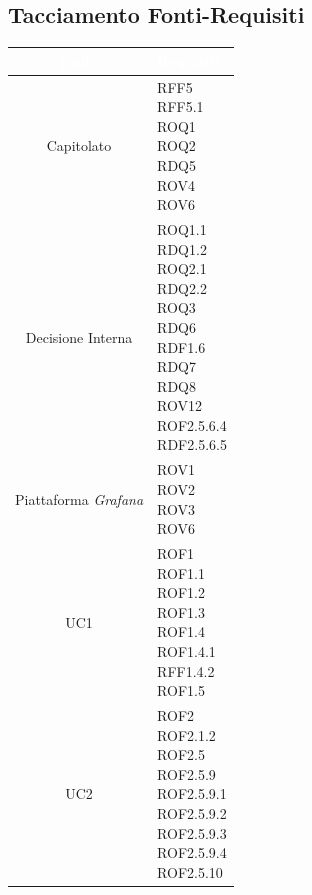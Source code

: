 \subsection{Tacciamento Fonti-Requisiti}\label{Tracciamento}
\begin{center}
\begin{longtable}[c]{|c|m{}|}
\hline
\rowcolor{bluelogo}\textbf{\textcolor{white}{Fonte}} & \textbf{\textcolor{white}{Requisiti}}\\
\hline \hline
\endhead
Capitolato & \makecell{RFF5\\RFF5.1\\ROQ1\\ROQ2\\RDQ5\\ROV4\\ROV6}\\
\hline
\rowcolor{grigio}Decisione Interna & \makecell{ROQ1.1\\RDQ1.2\\ROQ2.1\\RDQ2.2\\ROQ3\\RDQ6\\RDF1.6\\RDQ7\\RDQ8\\ROV12\\ROF2.5.6.4\\RDF2.5.6.5}\\
\hline
Piattaforma \textit{Grafana} & \makecell{ROV1\\ROV2\\ROV3\\ROV6}\\
\hline
\rowcolor{grigio}UC1 & \makecell{ROF1\\ROF1.1\\ROF1.2\\ROF1.3\\ROF1.4\\ROF1.4.1\\RFF1.4.2\\ROF1.5}\\
\hline
UC2 & \makecell{ROF2\\ROF2.1.2\\ROF2.5\\ROF2.5.9\\ROF2.5.9.1\\ROF2.5.9.2\\ROF2.5.9.3\\ROF2.5.9.4\\ROF2.5.10}\\

\end{longtable}
\end{center}
